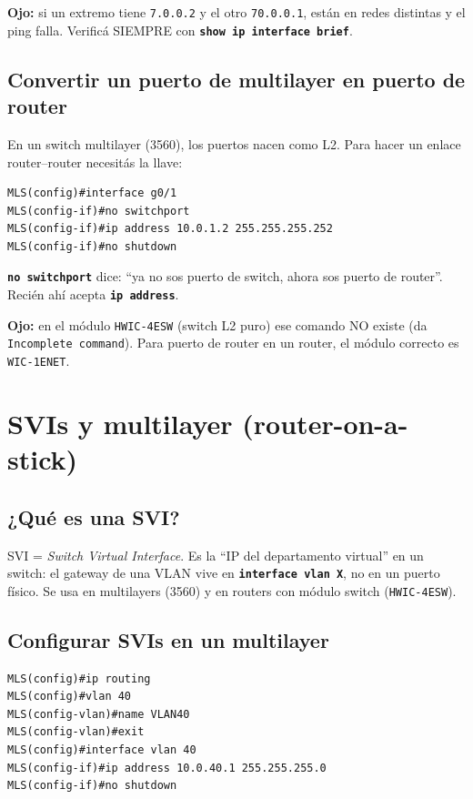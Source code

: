 \documentclass[11pt,a4paper]{report}
\newcommand{\cmd}[1]{\texttt{\textbf{#1}}}
\begin{document}
\textbf{Ojo:} si un extremo tiene \texttt{7.0.0.2} y el otro \texttt{70.0.0.1}, están en redes distintas y el ping falla. Verificá SIEMPRE con \cmd{show ip interface brief}.

\section{Convertir un puerto de multilayer en puerto de router}

En un switch multilayer (3560), los puertos nacen como L2. Para hacer un enlace router--router necesitás la llave:

\begin{lstlisting}
MLS(config)#interface g0/1
MLS(config-if)#no switchport
MLS(config-if)#ip address 10.0.1.2 255.255.255.252
MLS(config-if)#no shutdown
\end{lstlisting}

\cmd{no switchport} dice: ``ya no sos puerto de switch, ahora sos puerto de router''. Recién ahí acepta \cmd{ip address}.

\textbf{Ojo:} en el módulo \texttt{HWIC-4ESW} (switch L2 puro) ese comando NO existe (da \texttt{Incomplete command}). Para puerto de router en un router, el módulo correcto es \texttt{WIC-1ENET}.

\chapter{SVIs y multilayer (router-on-a-stick)}

\section{¿Qué es una SVI?}

SVI = \emph{Switch Virtual Interface}. Es la ``IP del departamento virtual'' en un switch: el gateway de una VLAN vive en \cmd{interface vlan X}, no en un puerto físico. Se usa en multilayers (3560) y en routers con módulo switch (\texttt{HWIC-4ESW}).

\section{Configurar SVIs en un multilayer}

\begin{lstlisting}
MLS(config)#ip routing
MLS(config)#vlan 40
MLS(config-vlan)#name VLAN40
MLS(config-vlan)#exit
MLS(config)#interface vlan 40
MLS(config-if)#ip address 10.0.40.1 255.255.255.0
MLS(config-if)#no shutdown
\end{lstlisting}
\end{document}
